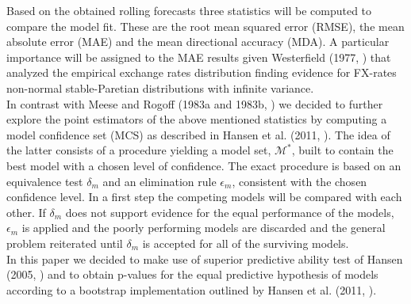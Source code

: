 Based on the obtained rolling forecasts three statistics will be computed to compare the model fit.
These are the root mean squared error (RMSE), the mean absolute error (MAE) and the mean directional accuracy (MDA).
A particular importance will be assigned to the MAE results given Westerfield (1977, \cite{Westerfield})
that analyzed the empirical exchange rates distribution finding evidence for FX-rates
non-normal stable-Paretian distributions with infinite variance.\\
In contrast with Meese and Rogoff (1983a and 1983b, \cite{MeeseRogoffa, MeeseRogoffb}) we decided
to further explore the point estimators of the above mentioned statistics by computing a model confidence set (MCS)
as described in Hansen et al. (2011, \cite{HansenMCS}).
The idea of the latter consists of a procedure yielding a model set, $\mathcal{M}^*$, built to contain the
best model with a chosen level of confidence. The exact procedure is based on an equivalence test $\delta_m$ and an
elimination rule $\epsilon_m$, consistent with the chosen confidence level. In a first step the competing models will be
compared with each other. If $\delta_m$ does not support evidence for the equal performance of the models, $\epsilon_m$
is applied and the poorly performing models are discarded and the general problem reiterated until $\delta_m$ is accepted
for all of the surviving models.\\
In this paper we decided to make use of superior predictive ability test of Hansen (2005, \cite{HansenSPA})
and to obtain p-values for the equal predictive hypothesis of models according to a bootstrap implementation
outlined by Hansen et al. (2011, \cite{HansenMCS}).